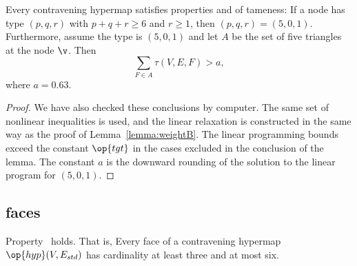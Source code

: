 \begin{lemma}[]\label{lemma:degE}
  Every contravening hypermap satisfies properties 
  and 
of tameness: 
If a node has type $(p,q,r)$ with $p+q+r\ge 6$ and $r\ge 1$, then $(p,q,r)=(5,0,1)$. 
Furthermore, assume the type is $(5,0,1)$ and let $A$ be the set of five triangles at the
node $\v$.  Then
%
\[ 
\sum_{F\in A} \tau(V,E,F) > a,
\] 
where $a=0.63$.
\end{lemma}



\begin{proof}  We have also checked these conclusions by computer.
  The same set of nonlinear inequalities is used, and the linear
  relaxation is constructed in the same way as the proof of 
Lemma~\ref{lemma:weightB}.  The linear programming
  bounds exceed the constant $\op{tgt}$ in the cases excluded in the
  conclusion of the lemma.  The constant $a$ is the downward rounding
  of the solution to the linear program for $(5,0,1)$.
\end{proof}
%

%

\subsection{faces}



\begin{lemma}[]  \label{lemma:face-size}
  Property~ holds.  That is, Every face of a
  contravening hypermap $\op{hyp}(V,E_{std})$ has cardinality at least
  three and at most six.
\end{lemma}

